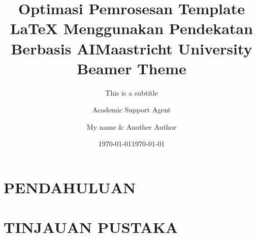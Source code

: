 \documentclass{beamer}
\title{Optimasi Pemrosesan Template LaTeX Menggunakan Pendekatan Berbasis AI}
\author{Academic Support Agent}
\date{\today}
\begin{document}
\maketitle

\begin{abstract}

\end{abstract}

\chapter{PENDAHULUAN}


\chapter{TINJAUAN PUSTAKA}





\title[Short Title]{Maastricht University Beamer Theme}
\subtitle{This is a subtitle}

\author[Me, other]{
  My name  \& Another Author 
}


\date{\today}


\end{document}
